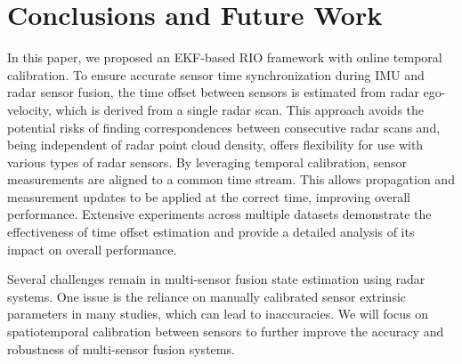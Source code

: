 \section{Conclusions and Future Work}
\label{sec: conclusion}
In this paper, we proposed an EKF-based RIO framework with online temporal calibration. To ensure accurate sensor time synchronization during IMU and radar sensor fusion, the time offset between sensors is estimated from radar ego-velocity, which is derived from a single radar scan. This approach avoids the potential risks of finding correspondences between consecutive radar scans and, being independent of radar point cloud density, offers flexibility for use with various types of radar sensors. By leveraging temporal calibration, sensor measurements are aligned to a common time stream. This allows propagation and measurement updates to be applied at the correct time, improving overall performance. Extensive experiments across multiple datasets demonstrate the effectiveness of time offset estimation and provide a detailed analysis of its impact on overall performance.

Several challenges remain in multi-sensor fusion state estimation using radar systems. One issue is the reliance on manually calibrated sensor extrinsic parameters in many studies, which can lead to inaccuracies. We will focus on spatiotemporal calibration between sensors to further improve the accuracy and robustness of multi-sensor fusion systems.